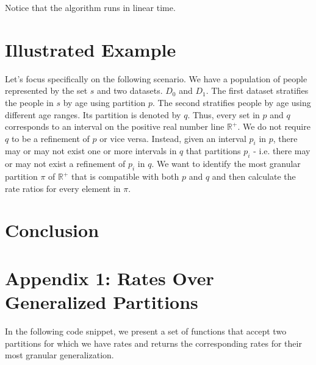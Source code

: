 \documentclass[]{article}
\begin{document}
Notice that the algorithm runs in linear time.

\hypertarget{illustrated-example}{%
\section{Illustrated Example}\label{illustrated-example}}

Let's focus specifically on the following scenario. We have a population
of people represented by the set \(s\) and two datasets. \(D_0\) and
\(D_1\). The first dataset stratifies the people in \(s\) by age using
partition \(p\). The second stratifies people by age using different age
ranges. Its partition is denoted by \(q\). Thus, every set in \(p\) and
\(q\) corresponds to an interval on the positive real number line
\(\mathbb{R}^+\). We do not require \(q\) to be a refinement of \(p\) or
vice versa. Instead, given an interval \(p_i\) in \(p\), there may or
may not exist one or more intervals in \(q\) that partitions \(p_i\) -
i.e. there may or may not exist a refinement of \(p_i\) in \(q\). We
want to identify the most granular partition \(\pi\) of \(\mathbb{R}^+\)
that is compatible with both \(p\) and \(q\) and then calculate the rate
ratios for every element in \(\pi\).

\hypertarget{conclusion}{%
\section{Conclusion}\label{conclusion}}

\hypertarget{appendix-1-rates-over-generalized-partitions}{%
\section{Appendix 1: Rates Over Generalized
Partitions}\label{appendix-1-rates-over-generalized-partitions}}

In the following code snippet, we present a set of functions that accept
two partitions for which we have rates and returns the corresponding
rates for their most granular generalization.
\end{document}
